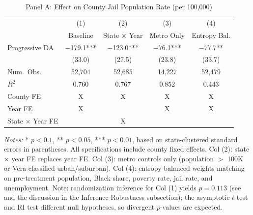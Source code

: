 \begin{table}[ht]
\centering
\caption{Panel A: Effect on County Jail Population Rate (per 100,000)}
\label{tab:jail}
\begin{tabular}{lcccc}
\toprule
 & (1) & (2) & (3) & (4) \\
 & Baseline & State $\times$ Year & Metro Only & Entropy Bal. \\
\midrule
Progressive DA & $-$179.1*** & $-$123.0*** & $-$76.1*** & $-$77.7** \\
 & (33.0) & (27.5) & (23.8) & (33.7) \\
\midrule
Num.\ Obs. & 52,704 & 52,685 & 14,227 & 52,479 \\
$R^2$ & 0.760 & 0.767 & 0.852 & 0.443 \\
County FE & X & X & X & X \\
Year FE & X &  & X & X \\
State $\times$ Year FE &  & X &  &  \\
\bottomrule
\end{tabular}
\begin{minipage}{\textwidth}
\vspace{0.5em}
\small \textit{Notes:} * $p < 0.1$, ** $p < 0.05$, *** $p < 0.01$, based on state-clustered standard errors in parentheses. All specifications include county fixed effects. Col (2): state $\times$ year FE replaces year FE. Col (3): metro controls only (population $>$ 100K or Vera-classified urban/suburban). Col (4): entropy-balanced weights matching on pre-treatment population, Black share, poverty rate, jail rate, and unemployment. Note: randomization inference for Col (1) yields $p = 0.113$ (see  and the discussion in the Inference Robustness subsection); the asymptotic $t$-test and RI test different null hypotheses, so divergent $p$-values are expected.
\end{minipage}
\end{table}
